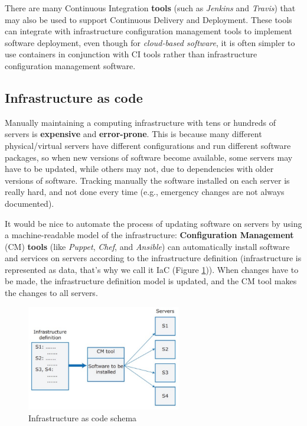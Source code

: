 There are many Continuous Integration \textbf{tools} (such as \textit{Jenkins} and \textit{Travis}) that may also be used to support Continuous Delivery and Deployment. These tools can integrate with infrastructure configuration management tools to implement software deployment, even though for \textit{cloud-based software}, it is often simpler to use containers in conjunction with CI tools rather than infrastructure configuration management software.

\subsection{Infrastructure as code}

Manually maintaining a computing infrastructure with tens or hundreds of servers is \textbf{expensive} and \textbf{error-prone}. This is because many different physical/virtual servers have different configurations and run different software packages, so when new versions of software become available, some servers may have to be updated, while others may not, due to dependencies with older versions of software. Tracking manually the software installed on each server is really hard, and not done every time (e.g., emergency changes are not always documented).

It would be nice to automate the process of updating software on servers by using a machine-readable model of the infrastructure: \textbf{Configuration Management} (CM) \textbf{tools} (like \textit{Puppet}, \textit{Chef}, and \textit{Ansible}) can automatically install software and services on servers according to the infrastructure definition (infrastructure is represented as data, that's why we call it IaC (Figure \ref{fig:IaC})). When changes have to be made, the infrastructure definition model is updated, and the CM tool makes the changes to all servers.

\newpage

\begin{figure} [H]
    \centering
    \includegraphics[width=0.6\textwidth]{images/DevOps/IaC.PNG}
    \caption{Infrastructure as code schema}
    \label{fig:IaC}
\end{figure} 

